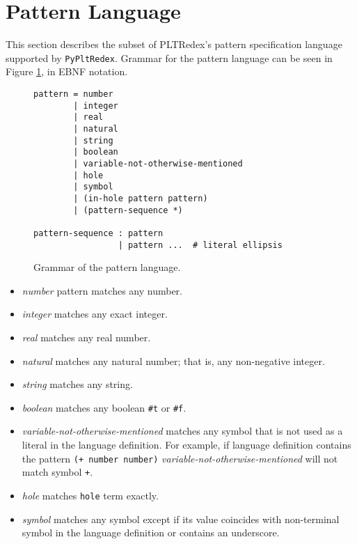 \section{Pattern Language}

This section describes the subset of PLTRedex's pattern specification language supported by \texttt{PyPltRedex}. Grammar for the pattern language can be seen in Figure \ref{pattern-grammar}, in EBNF notation. 

\begin{figure}[h]
\begin{verbatim}
pattern = number 
        | integer 
        | real 
        | natural 
        | string 
        | boolean 
        | variable-not-otherwise-mentioned 
        | hole 
        | symbol
        | (in-hole pattern pattern)
        | (pattern-sequence *) 

pattern-sequence : pattern 
                 | pattern ...  # literal ellipsis
\end{verbatim}
\caption{Grammar of the pattern language.}
\label{pattern-grammar}
\end{figure}

\begin{itemize}
\item
\textit{number} pattern matches any number.

\item
\textit{integer} matches any exact integer. 

\item
\textit{real} matches any real number.

\item
\textit{natural} matches any natural number; that is, any non-negative integer.

\item
\textit{string} matches any string.

\item
\textit{boolean} matches any boolean \texttt{\#t} or \texttt{\#f}.
\item
\textit{variable-not-otherwise-mentioned} matches any symbol that is not used as a literal in the language definition. For example, if language definition contains the pattern \texttt{(+ number number)} \textit{variable-not-otherwise-mentioned} will not match symbol \texttt{+}.

\item
\textit{hole} matches \texttt{hole} term exactly.

\item
\textit{symbol} matches any symbol except if its value coincides with non-terminal symbol in the language definition or contains an underscore.
\end{itemize}

